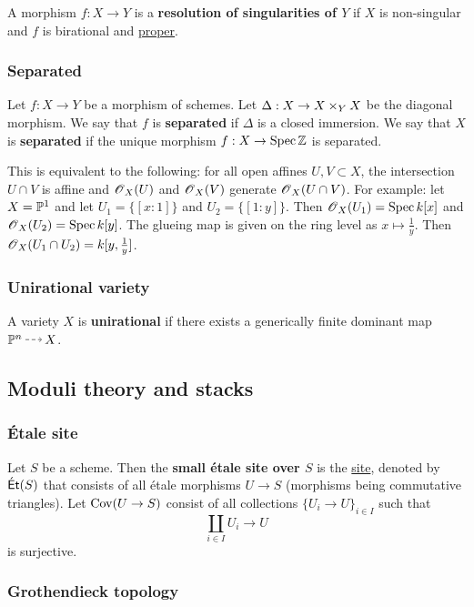 \documentclass[11pt, english]{article}
\begin{document}
A morphism $f:X \to Y$ is a \textbf{resolution of singularities of $Y$} if $X$ is non-singular and $f$ is birational and \hyperref[proper]{proper}. 

\subsubsection{Separated}
\label{separated}
Let $f:X \to Y$ be a morphism of schemes. Let $\Delta:X \to X \times_Y X$ be the diagonal morphism. We say that $f$ is \textbf{separated} if $\Delta$ is a closed immersion. We say that $X$ is \textbf{separated} if the unique morphism $f:X \to \operatorname{Spec} \mathbb{Z}$ is separated.

This is equivalent to the following: for all open affines $U,V \subset X$, the intersection $U \cap V$ is affine and $\operatorname{\mathscr{O}}_X(U)$ and $\operatorname{\mathscr{O}}_X(V)$ generate $\operatorname{\mathscr{O}}_X(U \cap V)$. For example: let $X=\mathbb{P}^1$ and let $U_1=\{ [x:1] \}$ and $U_2= \{ [1:y] \}$. Then $\operatorname{\mathscr{O}}_X(U_1)=\operatorname{Spec} k[x]$ and $\operatorname{\mathscr{O}}_X(U_2)=\operatorname{Spec} k[y]$. The glueing map is given on the ring level as $x \mapsto \frac 1y$. Then $\operatorname{\mathscr{O}}_X(U_1 \cap U_2) = k[y,\frac 1y]$. 

\subsubsection{Unirational variety}
\label{unirational}

A variety $X$ is \textbf{unirational} if there exists a generically finite dominant map $\PP^n \rmap X$. 

\subsection{Moduli theory and stacks} 

\subsubsection{Étale site}
\label{etalesite}

Let $S$ be a scheme. Then the \textbf{small étale site over $S$} is the \hyperref[site]{site}, denoted by $\mathsf{\acute{E}t}(S)$ that consists of all étale morphisms $U \to S$ (morphisms being commutative triangles). Let $\operatorname{Cov}(U \to S)$ consist of all collections $\{ U_i \to U \}_{i \in I}$ such that
\[
\coprod_{i \in I} U_i \to U
\]
is surjective.

\subsubsection{Grothendieck topology}
\label{grothendiecktopology}
\end{document}
